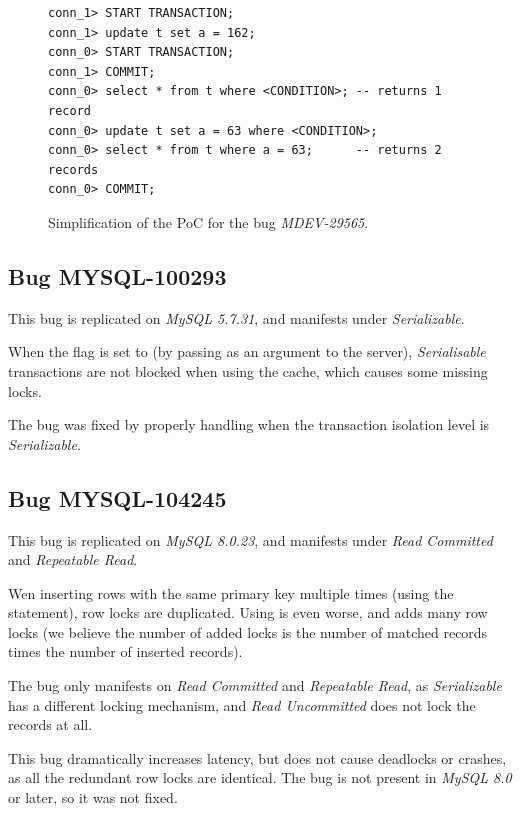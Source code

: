 \begin{figure}
\begin{verbatim}
conn_1> START TRANSACTION;
conn_1> update t set a = 162;
conn_0> START TRANSACTION;
conn_1> COMMIT;
conn_0> select * from t where <CONDITION>; -- returns 1 record
conn_0> update t set a = 63 where <CONDITION>;
conn_0> select * from t where a = 63;      -- returns 2 records
conn_0> COMMIT;
\end{verbatim}
\caption{Simplification of the PoC for the bug \textit{MDEV-29565}.} \label{fig:MDEV-29565}
\end{figure}


\subsection*{Bug MYSQL-100293}

This bug is replicated on \textit{MySQL 5.7.31}, and manifests under \textit{Serializable}.

When the  flag is set to  (by passing  as an argument to the server), \textit{Serialisable} transactions are not blocked when using the cache, which causes some missing locks.

The bug was fixed by properly handling  when the transaction isolation level is \textit{Serializable}.

\subsection*{Bug MYSQL-104245}


This bug is replicated on \textit{MySQL 8.0.23}, and manifests under \textit{Read Committed} and \textit{Repeatable Read}.

Wen inserting rows with the same primary key multiple times (using the  statement), row locks are duplicated. Using  is even worse, and adds many row locks (we believe the number of added locks is the number of matched records times the number of inserted records).

The bug only manifests on \textit{Read Committed} and \textit{Repeatable Read}, as \textit{Serializable} has a different locking mechanism, and \textit{Read Uncommitted} does not lock the records at all.

This bug dramatically increases latency, but does not cause deadlocks or crashes, as all the redundant row locks are identical. The bug is not present in \textit{MySQL 8.0} or later, so it was not fixed.

